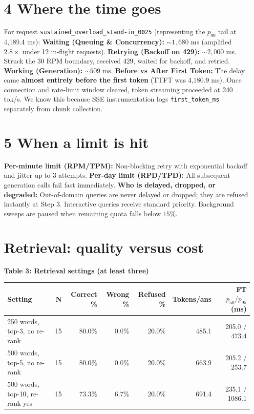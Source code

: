 \documentclass[10pt,a4paper]{article}
\begin{document}
\section*{4 Where the time goes}
For request \texttt{sustained\_overload\_stand-in\_0025} (representing the $p_{99}$ tail at 4,189.4 ms):
\textbf{Waiting (Queuing \& Concurrency):} $\sim 1,680$ ms (amplified $2.8\times$ under 12 in-flight requests).
\textbf{Retrying (Backoff on 429):} $\sim 2,000$ ms. Struck the 30 RPM boundary, received 429, waited for backoff, and retried.
\textbf{Working (Generation):} $\sim 509$ ms.
\textbf{Before vs After First Token:} The delay came \textbf{almost entirely before the first token} (TTFT was 4,180.9 ms). Once connection and rate-limit window cleared, token streaming proceeded at 240 tok/s. We know this because SSE instrumentation logs \texttt{first\_token\_ms} separately from chunk collection.

\section*{5 When a limit is hit}
\textbf{Per-minute limit (RPM/TPM):} Non-blocking retry with exponential backoff and jitter up to 3 attempts.
\textbf{Per-day limit (RPD/TPD):} All subsequent generation calls fail fast immediately.
\textbf{Who is delayed, dropped, or degraded:} Out-of-domain queries are never delayed or dropped; they are refused instantly at Step 3. Interactive queries receive standard priority. Background sweeps are paused when remaining quota falls below $15\%$.

\section*{Retrieval: quality versus cost}

\textbf{Table 3: Retrieval settings (at least three)}
\begin{center}
\footnotesize
\begin{tabularx}{\textwidth}{p{4.2cm}rrrrrr}
\toprule
\textbf{Setting} & \textbf{N} & \textbf{Correct \%} & \textbf{Wrong \%} & \textbf{Refused \%} & \textbf{Tokens/ans} & \textbf{FT $p_{50}/p_{95}$ (ms)} \\
\midrule
250 words, top-3, no re-rank & 15 & 80.0\% & 0.0\% & 20.0\% & 485.1 & 205.0 / 473.4 \\
500 words, top-5, no re-rank & 15 & 80.0\% & 0.0\% & 20.0\% & 663.9 & 205.2 / 253.7 \\
500 words, top-10, re-rank yes & 15 & 73.3\% & 6.7\% & 20.0\% & 691.4 & 235.1 / 1086.1 \\
\bottomrule
\end{tabularx}
\end{center}
\end{document}
